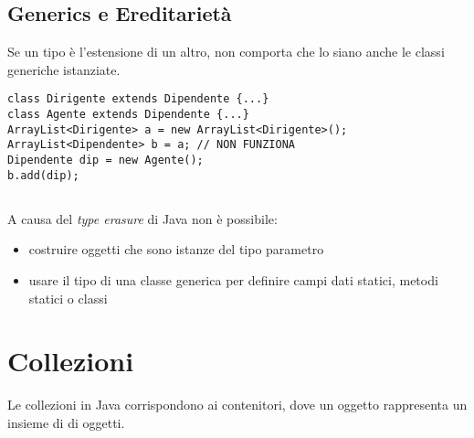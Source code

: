\subsection*{Generics e Ereditarietà}
Se un tipo è l'estensione di un altro, non comporta che lo siano anche le classi generiche istanziate. 
\begin{lstlisting}
class Dirigente extends Dipendente {...}
class Agente extends Dipendente {...}
ArrayList<Dirigente> a = new ArrayList<Dirigente>();
ArrayList<Dipendente> b = a; // NON FUNZIONA
Dipendente dip = new Agente();
b.add(dip); 
\end{lstlisting}

\subsection*{}
A causa del \textit{type erasure} di Java non è possibile:
\begin{itemize}
\item costruire oggetti che sono istanze del tipo parametro
\item usare il tipo di una classe generica per definire campi dati statici, metodi statici o classi
\end{itemize}

\section{Collezioni}
Le collezioni in Java corrispondono ai contenitori, dove un oggetto rappresenta un insieme di di oggetti.
